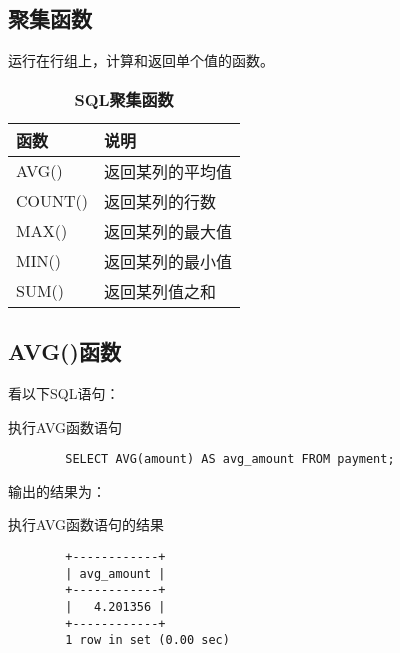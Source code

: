 \documentclass[UTF8]{article}
\begin{document}
\subsection{聚集函数}

\begin{redbox}[frametitle={Defination 12.1 聚集函数（aggregate function） }]
        运行在行组上，计算和返回单个值的函数。
\end{redbox}

\begin{table}[H]
        \caption{\textbf{SQL聚集函数}}%
        \centering%
        \begin{tabular}{ll}%
        \toprule%
        函数&说明\\
        \midrule%
        AVG()  & 返回某列的平均值     \\ 
        COUNT()  & 返回某列的行数     \\ 
        MAX() & 返回某列的最大值    \\ 
        MIN()  & 返回某列的最小值       \\ 
        SUM()  & 返回某列值之和             \\ 
        \bottomrule%
        \end{tabular}
\end{table}  

\subsection{AVG()函数}

看以下SQL语句：
\begin{listing}[H]
	\caption{执行AVG函数语句}
	\label{code:avgfunctionclause}
\begin{verbatim}
        SELECT AVG(amount) AS avg_amount FROM payment;      
\end{verbatim}
\end{listing}

输出的结果为：

\begin{listing}[H]
	\caption{执行AVG函数语句的结果}
	\label{code:avgfunctionclauseresult}
\begin{verbatim}
        +------------+
        | avg_amount |
        +------------+
        |   4.201356 |
        +------------+
        1 row in set (0.00 sec)
\end{verbatim}
\end{listing}
\end{document}
